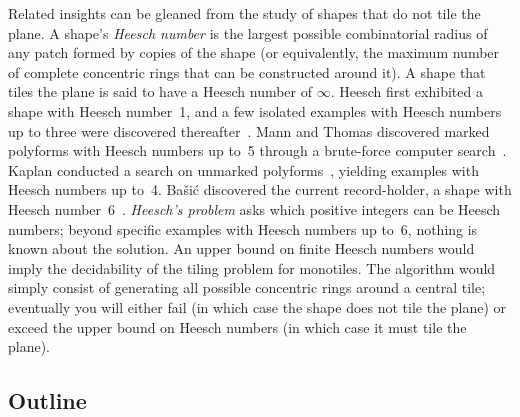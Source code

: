 Related insights can be gleaned from the study of shapes that do not tile
the plane.  A shape's \emph{Heesch number} is the largest possible 
combinatorial radius of any patch formed by copies of the shape (or
equivalently, the maximum number of complete concentric rings that can 
be constructed around it).  A shape that tiles the plane is said to have a
Heesch number of $\infty$.  Heesch first exhibited a shape with Heesch
number~1, and a few isolated examples with Heesch numbers up to three were
discovered thereafter~\cite{Mann2004}.  Mann and Thomas discovered marked
polyforms with Heesch numbers up to~5 through a brute-force computer 
search~\cite{MT2016}.  Kaplan conducted a search on unmarked 
polyforms~\cite{Kaplan}, yielding examples with Heesch numbers up to~4.
Ba{\v{s}}i{\'c} discovered the current record-holder, a shape with Heesch
number~6~\cite{Basic2021}.  \emph{Heesch's problem} asks which 
positive integers can be Heesch numbers; beyond specific examples with
Heesch numbers up to~6, nothing is known about the solution.
An upper bound on finite Heesch numbers would imply the decidability of 
the tiling problem for monotiles. The algorithm would simply consist of
generating all possible concentric rings around a central tile; eventually
you will either fail (in which case the shape does not tile the plane) or
exceed the upper bound on Heesch numbers (in which case it must tile the plane).

\subsection{Outline}

